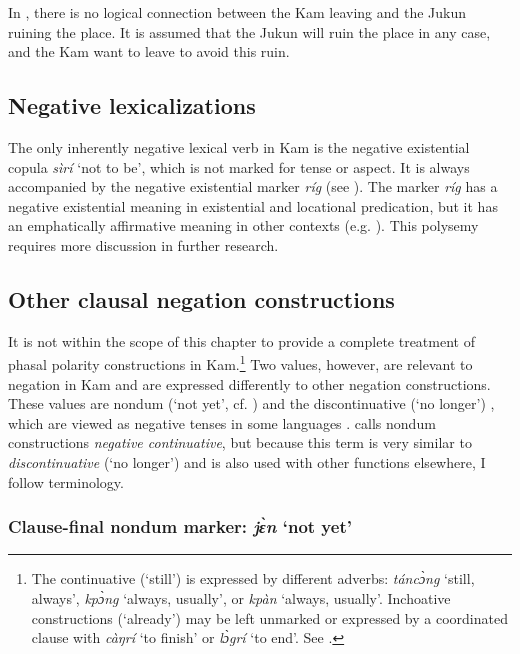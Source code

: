 \documentclass[output=paper,colorlinks,citecolor=brown]{langscibook}
\begin{document}
In , there is no logical connection between the Kam leaving and the Jukun ruining the place. It is assumed that the Jukun will ruin the place in any case, and the Kam want to leave to avoid this ruin.
 
\subsection{Negative lexicalizations}\label{sec:kam:2.5}

The only inherently negative lexical verb in Kam is the negative existential copula \textit{sìrí} ‘not to be’, which is not marked for tense or aspect. It is always accompanied by the negative existential marker \textit{ríg} (see ). The marker \textit{ríg} has a negative existential meaning in existential and locational predication, but it has an emphatically affirmative meaning in other contexts (e.g. ). This polysemy requires more discussion in further research.

\subsection{Other clausal negation constructions}\label{sec:kam:2.6}

It is not within the scope of this chapter to provide a complete treatment of phasal polarity constructions in Kam.\footnote{The continuative (‘still’) is expressed by different adverbs: \textit{táncɔ̀ng} ‘still, always’, \textit{kpɔ̀ng} ‘always, usually’, or \textit{kpàn} ‘always, usually’. Inchoative constructions (‘already’) may be left unmarked or expressed by a coordinated clause with \textit{càŋrí} ‘to finish’ or \textit{lɔ̀grí} ‘to end’. See \citet[334--337]{Lesage2020}.} Two values, however, are relevant to negation in Kam and are expressed differently to other negation constructions. These values are nondum (‘not yet’, cf. \citealt{VeselinovaDevos2021}) and the discontinuative (‘no longer’) \citep{Auwera1998}, which are viewed as negative tenses in some languages \citep{Veselinova2017}.  calls nondum constructions \textit{negative continuative}, but because this term is very similar to \textit{discontinuative} (‘no longer’) and is also used with other functions elsewhere, I follow  terminology. 


\subsubsection{Clause-final nondum marker: \textit{jɛ̀n} ‘not yet’}\label{sec:kam:2.6.1}
\end{document}

